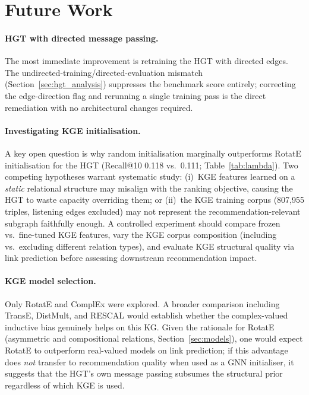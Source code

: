 \section{Future Work}
\label{sec:future_work}

\paragraph{HGT with directed message passing.}
The most immediate improvement is retraining the HGT with directed edges. The undirected-training/directed-evaluation mismatch (Section~\ref{sec:hgt_analysis}) suppresses the benchmark score entirely; correcting the edge-direction flag and rerunning a single training pass is the direct remediation with no architectural changes required.

\paragraph{Investigating KGE initialisation.}
A key open question is why random initialisation marginally outperforms RotatE initialisation for the HGT (Recall@10 0.118 vs.\ 0.111; Table~\ref{tab:lambda}). Two competing hypotheses warrant systematic study: (i)~KGE features learned on a \textit{static} relational structure may misalign with the ranking objective, causing the HGT to waste capacity overriding them; or (ii)~the KGE training corpus (807,955 triples, listening edges excluded) may not represent the recommendation-relevant subgraph faithfully enough. A controlled experiment should compare frozen vs.\ fine-tuned KGE features, vary the KGE corpus composition (including vs.\ excluding different relation types), and evaluate KGE structural quality via link prediction before assessing downstream recommendation impact.

\paragraph{KGE model selection.}
Only RotatE and ComplEx were explored. A broader comparison including TransE, DistMult, and RESCAL would establish whether the complex-valued inductive bias genuinely helps on this KG. Given the rationale for RotatE (asymmetric and compositional relations, Section~\ref{sec:models}), one would expect RotatE to outperform real-valued models on link prediction; if this advantage does \textit{not} transfer to recommendation quality when used as a GNN initialiser, it suggests that the HGT's own message passing subsumes the structural prior regardless of which KGE is used.


